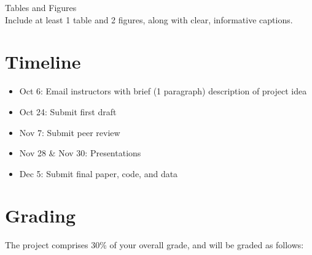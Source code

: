 \documentclass[12pt]{article}
\begin{document}
Tables and Figures \\
Include at least 1 table and 2 figures, along with
clear, informative captions. 


\section*{Timeline}

\begin{itemize}
  \item Oct 6: Email instructors with brief (1 paragraph) description
    of project idea
  \item Oct 24: Submit first draft
  \item Nov 7: Submit peer review
  \item Nov 28 \& Nov 30: Presentations
  \item Dec 5: Submit final paper, code, and data
\end{itemize}


\section*{Grading}

The project comprises 30\% of your overall grade, and will be graded as follows:
\end{document}
